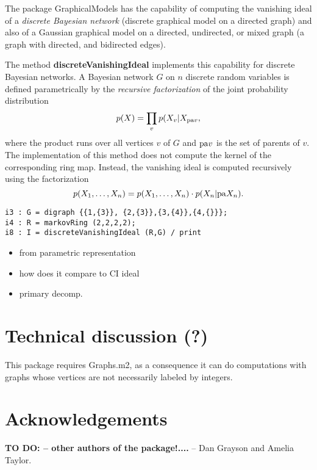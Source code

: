\documentclass[letterpaper]{article}
\theoremstyle{definition}
\newcommand{\pa}{{\rm pa}}
\begin{document}
The package GraphicalModels has the capability of computing the vanishing ideal
of  a \emph{discrete Bayesian network} (discrete graphical model on a directed
graph) and also of a Gaussian graphical model on a directed, undirected, or  mixed
graph (a graph with directed, and bidirected edges). 

The method
\textbf{discreteVanishingIdeal} implements this capability for discrete Bayesian
networks. A Bayesian network $G$ on $n$ discrete random variables 
is defined parametrically by the
\emph{recursive factorization} of the joint probability  distribution
\[p(X) = \prod_{v} p(X_{v} | X_{\pa v},\]
where the product runs over all vertices $v$ of $G$ and $\pa v$ is the set of
parents of $v$. 
The implementation of this method does not compute the kernel of the
corresponding ring map. Instead, the vanishing ideal is
computed recursively using the factorization 
\[p(X_{1},\dots, X_{n}) = p(X_{1},\dots, X_{n})\cdot p(X_{n} | \pa X_{n}).\]

\begin{verbatim}
i3 : G = digraph {{1,{3}}, {2,{3}},{3,{4}},{4,{}}};
i4 : R = markovRing (2,2,2,2);
i8 : I = discreteVanishingIdeal (R,G) / print

\end{verbatim}


\begin{itemize}
\item from parametric representation
\item how does it compare to CI ideal
\item primary decomp.
\end{itemize}




\section{Technical discussion (?) }
This package requires Graphs.m2, as a consequence it can do
computations with graphs whose vertices are not necessarily labeled by
integers. 


\section*{Acknowledgements} {\bf TO DO: -- other authors of the package!....} -- Dan Grayson and Amelia Taylor.
\end{document}
